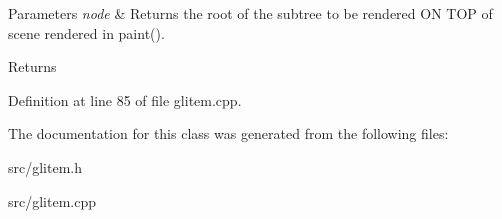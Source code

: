 \begin{DoxyParams}{Parameters}
{\em node} & Returns the root of the subtree to be rendered ON T\+OP of scene rendered in paint(). \\
\hline
\end{DoxyParams}
\begin{DoxyReturn}{Returns}

\end{DoxyReturn}


Definition at line 85 of file glitem.\+cpp.



The documentation for this class was generated from the following files\+:\begin{DoxyCompactItemize}
\item 
src/glitem.\+h\item 
src/glitem.\+cpp\end{DoxyCompactItemize}
